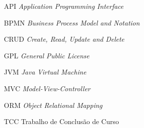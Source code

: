 \begin{siglas}
  \item[API] \textit{Application Programming Interface}
  \item[BPMN] \textit{Business Process Model and Notation}
  \item[CRUD] \textit{Create, Read, Update and Delete} 
  \item[GPL] \textit{General Public License} 
  \item[JVM] \textit{Java Virtual Machine}
  \item[MVC] \textit{Model-View-Controller}
  \item[ORM] \textit{Object Relational Mapping}
  \item[TCC] Trabalho de Conclusão de Curso
\end{siglas}
